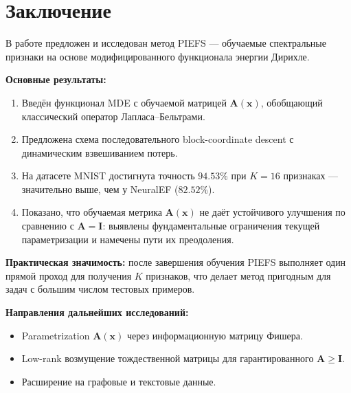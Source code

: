 \documentclass[14pt, a4paper, oneside]{extreport}
\theoremstyle{plain}
\theoremstyle{definition}
\begin{document}
\chapter{Заключение}
\label{ch:conclusion}

В работе предложен и исследован метод PIEFS — обучаемые спектральные признаки на основе модифицированного функционала энергии Дирихле.

\textbf{Основные результаты:}
\begin{enumerate}
  \item Введён функционал MDE с обучаемой матрицей $\mathbf{A}(\mathbf{x})$, обобщающий классический оператор Лапласа--Бельтрами.
  \item Предложена схема последовательного block-coordinate descent с динамическим взвешиванием потерь.
  \item На датасете MNIST достигнута точность $94.53\%$ при $K=16$ признаках — значительно выше, чем у NeuralEF ($82.52\%$).
  \item Показано, что обучаемая метрика $\mathbf{A}(\mathbf{x})$ не даёт устойчивого улучшения по сравнению с $\mathbf{A}=\mathbf{I}$: выявлены фундаментальные ограничения текущей параметризации и намечены пути их преодоления.
\end{enumerate}

\textbf{Практическая значимость:} после завершения обучения PIEFS выполняет один прямой проход для получения $K$ признаков, что делает метод пригодным для задач с большим числом тестовых примеров.

\textbf{Направления дальнейших исследований:}
\begin{itemize}
  \item Parametrization $\mathbf{A}(\mathbf{x})$ через информационную матрицу Фишера.
  \item Low-rank возмущение тождественной матрицы для гарантированного $\mathbf{A} \geq \mathbf{I}$.
  \item Расширение на графовые и текстовые данные.
\end{itemize}




\appendix
\end{document}
